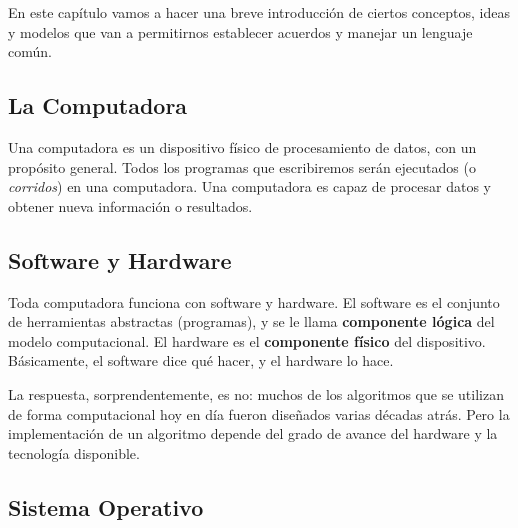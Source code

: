 \documentclass[
  letterpaper,
  DIV=11,
  numbers=noendperiod]{scrreprt}
\begin{document}
En este capítulo vamos a hacer una breve introducción de ciertos
conceptos, ideas y modelos que van a permitirnos establecer acuerdos y
manejar un lenguaje común.

\subsection{La Computadora}\label{la-computadora}

Una computadora es un dispositivo físico de procesamiento de datos, con
un propósito general. Todos los programas que escribiremos serán
ejecutados (o \emph{corridos}) en una computadora. Una computadora es
capaz de procesar datos y obtener nueva información o resultados.

\subsection{Software y Hardware}\label{software-y-hardware}

Toda computadora funciona con software y hardware. El software es el
conjunto de herramientas abstractas (programas), y se le llama
\textbf{componente lógica} del modelo computacional. El hardware es el
\textbf{componente físico} del dispositivo. Básicamente, el software
dice qué hacer, y el hardware lo hace.

\begin{tcolorbox}[enhanced jigsaw, opacitybacktitle=0.6, toptitle=1mm, toprule=.15mm, arc=.35mm, breakable, bottomrule=.15mm, opacityback=0, leftrule=.75mm, rightrule=.15mm, title=\textcolor{quarto-callout-tip-color}{\faLightbulb}\hspace{0.5em}{\textbf{¿Es indispensable tener una computadora para crear un
algoritmo?}\\
}, left=2mm, bottomtitle=1mm, colframe=quarto-callout-tip-color-frame, colback=white, titlerule=0mm, coltitle=black, colbacktitle=quarto-callout-tip-color!10!white]

La respuesta, sorprendentemente, es no: muchos de los algoritmos que se
utilizan de forma computacional hoy en día fueron diseñados varias
décadas atrás. Pero la implementación de un algoritmo depende del grado
de avance del hardware y la tecnología disponible.

\end{tcolorbox}

\subsection{Sistema Operativo}\label{sistema-operativo}
\end{document}
